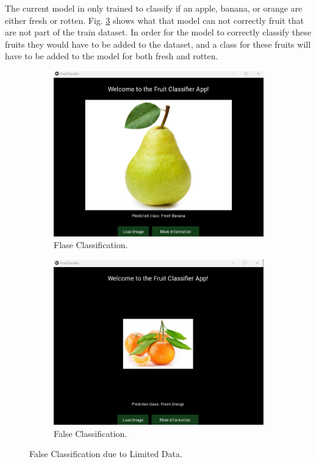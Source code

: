\documentclass[conference]{IEEEtran}
\begin{document}
The current model in only trained to classify if an apple, banana, or orange are either fresh or rotten. Fig. \ref{FigLimData} shows what that model can not correctly fruit that are not part of the train dataset. In order for the model to correctly classify these fruits they would have to be added to the dataset, and a class for these fruits will have to be added to the model for both fresh and rotten.

\begin{figure}[h]
    \centering
    \begin{subfigure}[b]{0.48\linewidth}
        \centering
        \includegraphics[width=\linewidth]{Pear not in dataset.png}
        \caption{Flase Classification.}
        \label{figFA}
    \end{subfigure}
    \hfill
    \begin{subfigure}[b]{0.48\linewidth}
        \centering
        \includegraphics[width=\linewidth]{Tangerine not in dataset.png}
        \caption{False Classification.}
        \label{figFB}
    \end{subfigure}
    \caption{False Classification due to Limited Data.}
    \label{FigLimData}
\end{figure}
\end{document}
